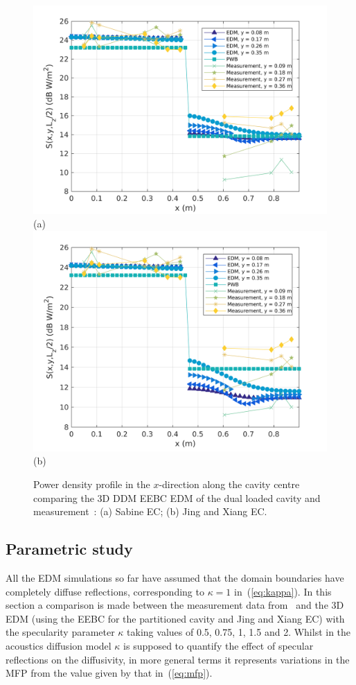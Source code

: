 \documentclass[a4paper]{article}
\numberwithin{equation}{section}
\begin{document}
\begin{figure}[hp]
\begin{center}
\includegraphics[width=0.6\linewidth]{figures/DDM-EEBC_3D_DL_PowerDensityProfileXMeas}\\
{\footnotesize (a)}\\
\vspace{2mm}
\includegraphics[width=0.6\linewidth]{figures/DDM-EEBC_3D_DL_PowerDensityProfileXMeas_JX}\\
{\footnotesize (b)}\\
\vspace{-2mm}
\caption{\label{fg:measprofsdl} Power density profile in the $x$-direction along the cavity centre comparing
the 3D DDM EEBC EDM of the dual loaded cavity and measurement~\citep{Flintoft2017b}: (a) Sabine EC; (b) Jing and Xiang EC.}
\end{center}
\end{figure}

\subsection[Parametric study]{Parametric study}
\label{sc:res:para}

All the EDM simulations so far have assumed that the domain boundaries have completely diffuse reflections,
corresponding to $\kappa=1$ in~(\ref{eq:kappa}). In this section a comparison is made between the measurement
data from~\citep{Flintoft2017b} and the 3D EDM (using the EEBC for the partitioned cavity and Jing and Xiang EC)
with the specularity parameter $\kappa$ taking values of 0.5, 0.75, 1, 1.5 and 2. Whilst in the acoustics
diffusion model $\kappa$ is supposed to quantify the effect of specular reflections on the diffusivity, in
more general terms it represents variations in the MFP from the value given by that in~(\ref{eq:mfp}).
\end{document}
